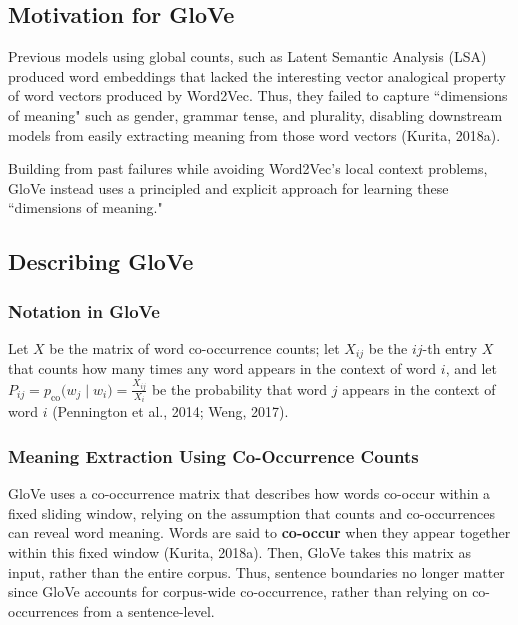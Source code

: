 \subsection{Motivation for GloVe} \label{sec:MotivationGlove}

Previous models using global counts, such as Latent Semantic Analysis (LSA) produced word embeddings that lacked the interesting vector analogical property of word vectors produced by Word2Vec. Thus, they failed to capture ``dimensions of meaning" such as gender, grammar tense, and plurality, disabling downstream models from easily extracting meaning from those word vectors (Kurita, 2018a). 

Building from past failures while avoiding Word2Vec's local context problems, GloVe instead uses a principled and explicit approach for learning these ``dimensions of meaning."


\subsection{Describing GloVe} \label{sec:DefGlove}

\subsubsection{Notation in GloVe}

Let $X$ be the matrix of word co-occurrence counts; let $X_{ij}$ be the $ij$-th entry $X$ that counts how many times any word appears in the context of word $i$, and let $P_{ij} = p_{\text{co}} \Big(w_j \; | \; w_i \Big) = \frac {X_{ij}} {X_i}$ be the probability that word $j$ appears in the context of word $i$ (Pennington et al., 2014; Weng, 2017).

\subsubsection{Meaning Extraction Using Co-Occurrence Counts}

GloVe uses a co-occurrence matrix that describes how words co-occur within a fixed sliding window, relying on the assumption that counts and co-occurrences can reveal word meaning. Words are said to \textbf{co-occur} when they appear together within this fixed window (Kurita, 2018a). Then, GloVe takes this matrix as input, rather than the entire corpus. Thus, sentence boundaries no longer matter since GloVe accounts for corpus-wide co-occurrence, rather than relying on co-occurrences from a sentence-level.

